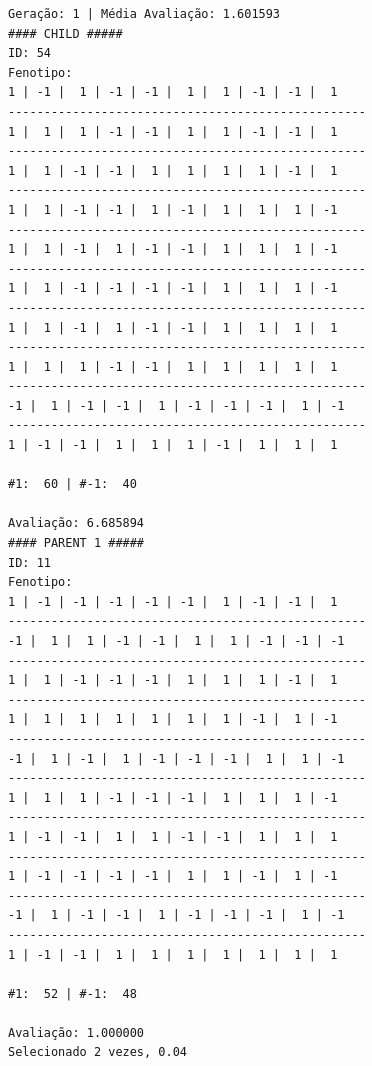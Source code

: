 	\begin{lstlisting}[caption={Resultado de um ciclo de seleção, crossover e mutação do GA para o modelo de Ising}, label=qd:resultado_reproducao_ising] 
Geração: 1 | Média Avaliação: 1.601593
#### CHILD #####
ID: 54
Fenotipo: 
1 | -1 |  1 | -1 | -1 |  1 |  1 | -1 | -1 |  1
--------------------------------------------------
1 |  1 |  1 | -1 | -1 |  1 |  1 | -1 | -1 |  1
--------------------------------------------------
1 |  1 | -1 | -1 |  1 |  1 |  1 |  1 | -1 |  1
--------------------------------------------------
1 |  1 | -1 | -1 |  1 | -1 |  1 |  1 |  1 | -1
--------------------------------------------------
1 |  1 | -1 |  1 | -1 | -1 |  1 |  1 |  1 | -1
--------------------------------------------------
1 |  1 | -1 | -1 | -1 | -1 |  1 |  1 |  1 | -1
--------------------------------------------------
1 |  1 | -1 |  1 | -1 | -1 |  1 |  1 |  1 |  1
--------------------------------------------------
1 |  1 |  1 | -1 | -1 |  1 |  1 |  1 |  1 |  1
--------------------------------------------------
-1 |  1 | -1 | -1 |  1 | -1 | -1 | -1 |  1 | -1
--------------------------------------------------
1 | -1 | -1 |  1 |  1 |  1 | -1 |  1 |  1 |  1

#1:  60 | #-1:  40

Avaliação: 6.685894
#### PARENT 1 #####
ID: 11
Fenotipo: 
1 | -1 | -1 | -1 | -1 | -1 |  1 | -1 | -1 |  1
--------------------------------------------------
-1 |  1 |  1 | -1 | -1 |  1 |  1 | -1 | -1 | -1
--------------------------------------------------
1 |  1 | -1 | -1 | -1 |  1 |  1 |  1 | -1 |  1
--------------------------------------------------
1 |  1 |  1 |  1 |  1 |  1 |  1 | -1 |  1 | -1
--------------------------------------------------
-1 |  1 | -1 |  1 | -1 | -1 | -1 |  1 |  1 | -1
--------------------------------------------------
1 |  1 |  1 | -1 | -1 | -1 |  1 |  1 |  1 | -1
--------------------------------------------------
1 | -1 | -1 |  1 |  1 | -1 | -1 |  1 |  1 |  1
--------------------------------------------------
1 | -1 | -1 | -1 | -1 |  1 |  1 | -1 |  1 | -1
--------------------------------------------------
-1 |  1 | -1 | -1 |  1 | -1 | -1 | -1 |  1 | -1
--------------------------------------------------
1 | -1 | -1 |  1 |  1 |  1 |  1 |  1 |  1 |  1

#1:  52 | #-1:  48

Avaliação: 1.000000
Selecionado 2 vezes, 0.04


\end{lstlisting}
